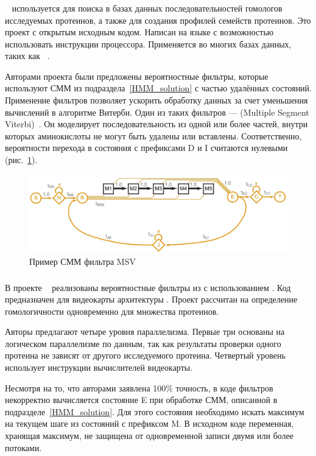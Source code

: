 \subsubsection{}
~\cite{HMMer} используется для поиска в базах данных 
последовательностей гомологов исследуемых протеинов, а также для создания 
профилей семейств протеинов.
Это проект с открытым исходным кодом.
Написан на языке  с возможностью использовать  инструкции 
процессора.
Применяется во многих базах данных, таких как ~\cite{Pfam}.

Авторами проекта были предложены вероятностные фильтры, которые используют СММ 
из подраздела~\ref{HMM_solution} с частью удалённых состояний.
Применение фильтров позволяет ускорить обработку данных за счет уменьшения
вычислений в алгоритме Витерби.
Один из таких фильтров ---  (Multiple Segment 
Viterbi)~\cite{MSV_Eddy}.
Он моделирует последовательность из одной или более частей, внутри которых
аминокислоты не могут быть удалены или вставлены.
Соответственно, вероятности перехода в состояния с префиксами D и I считаются 
нулевыми (рис.~\ref{MSV_example}).
\begin{figure}
  \centering
  \includegraphics[width=\columnwidth]{MSV.png}
  \caption{Пример СММ фильтра MSV~\cite{MSV_Eddy}}
  \label{MSV_example}
\end{figure}

\subsubsection{}
В проекте ~\cite{cudampf} реализованы вероятностные фильтры из 
 с использованием .
Код предназначен для видеокарты   архитектуры
.
Проект рассчитан на определение гомологичности одновременно для множества 
протеинов.

Авторы предлагают четыре уровня параллелизма.
Первые три основаны на логическом параллелизме по данным, так как результаты 
проверки одного протеина не зависят от другого исследуемого протеина.
Четвертый уровень использует  инструкции вычислителей видеокарты.

Несмотря на то, что авторами заявлена 100\% точность, в коде фильтров
некорректно вычисляется состояние E при обработке СММ, описанной в 
подразделе~\ref{HMM_solution}.
Для этого состояния необходимо искать максимум на текущем шаге из состояний с 
префиксом M.
В исходном коде  переменная, хранящая максимум, не защищена от 
одновременной записи двумя или более потоками.
